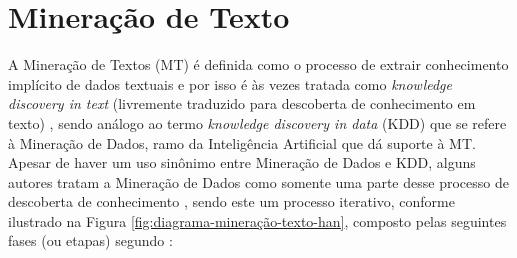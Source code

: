 \section{Mineração de Texto} \label{sec:MineraçãoTexto}
    A Mineração de Textos (MT) é definida como o processo de extrair conhecimento implícito de dados textuais \cite{Jo2018TMCIBDC,Feldman:2006:TMH:1076381} e por isso é às vezes tratada como \textit{knowledge discovery in text} (livremente traduzido para descoberta de conhecimento em texto) \cite{Kodratoff:1999:KDT:646358.689959, Feldman:1995:KDT:3001335.3001354}, sendo análogo ao termo \textit{knowledge discovery in data} (KDD) que se refere à Mineração de Dados, ramo da Inteligência Artificial que dá suporte à MT. 
    Apesar de haver um uso sinônimo entre Mineração de Dados e KDD, alguns autores tratam a Mineração de Dados como somente uma parte desse processo de descoberta de conhecimento \cite[p.~6]{Han:2011:DMC:1972541}, sendo este um processo iterativo, conforme ilustrado na Figura \ref{fig:diagrama-mineração-texto-han}, composto pelas seguintes fases (ou etapas) segundo :
